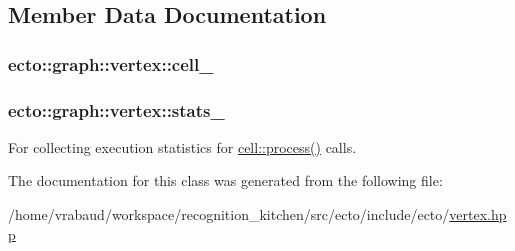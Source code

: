 \subsection{Member Data Documentation}
\hypertarget{classecto_1_1graph_1_1vertex_a14485eadc4288f5d4e5e32e6b5218ec7}{
\subsubsection[{cell\-\_\-}]{ ecto\-::graph\-::vertex\-::cell\-\_\-\hspace{0.3cm}{\ttfamily [private]}}}\label{classecto_1_1graph_1_1vertex_a14485eadc4288f5d4e5e32e6b5218ec7}
\hypertarget{classecto_1_1graph_1_1vertex_abf79016904200297ba32e42534c8ac53}{
\subsubsection[{stats\-\_\-}]{ ecto\-::graph\-::vertex\-::stats\-\_\-\hspace{0.3cm}{\ttfamily [private]}}}\label{classecto_1_1graph_1_1vertex_abf79016904200297ba32e42534c8ac53}


For collecting execution statistics for \hyperlink{structecto_1_1cell_a6b810671ee21f5dddbc1206abfb999f3}{cell\-::process()} calls. 



The documentation for this class was generated from the following file\-:\begin{DoxyCompactItemize}
\item 
/home/vrabaud/workspace/recognition\-\_\-kitchen/src/ecto/include/ecto/\hyperlink{vertex_8hpp}{vertex.\-hpp}\end{DoxyCompactItemize}

